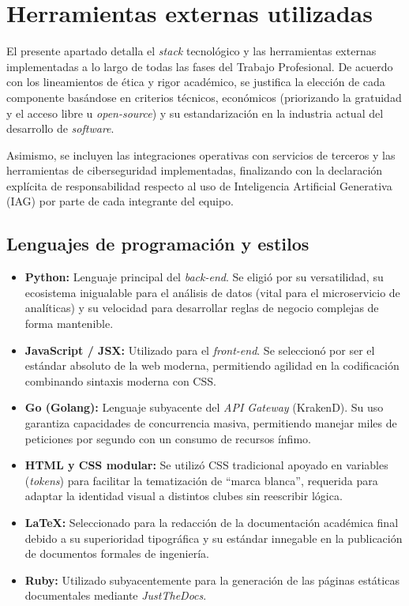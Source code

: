 \section{Herramientas externas utilizadas}

El presente apartado detalla el \textit{stack} tecnológico y las herramientas externas implementadas a lo largo de todas las fases del Trabajo Profesional. De acuerdo con los lineamientos de ética y rigor académico, se justifica la elección de cada componente basándose en criterios técnicos, económicos (priorizando la gratuidad y el acceso libre u \textit{open-source}) y su estandarización en la industria actual del desarrollo de \textit{software}.

Asimismo, se incluyen las integraciones operativas con servicios de terceros y las herramientas de ciberseguridad implementadas, finalizando con la declaración explícita de responsabilidad respecto al uso de Inteligencia Artificial Generativa (IAG) por parte de cada integrante del equipo.

\subsection{Lenguajes de programación y estilos}

\begin{itemize}
    \item \textbf{Python:} Lenguaje principal del \textit{back-end}. Se eligió por su versatilidad, su ecosistema inigualable para el análisis de datos (vital para el microservicio de analíticas) y su velocidad para desarrollar reglas de negocio complejas de forma mantenible.
    \item \textbf{JavaScript / JSX:} Utilizado para el \textit{front-end}. Se seleccionó por ser el estándar absoluto de la web moderna, permitiendo agilidad en la codificación combinando sintaxis moderna con CSS.
    \item \textbf{Go (Golang):} Lenguaje subyacente del \textit{API Gateway} (KrakenD). Su uso garantiza capacidades de concurrencia masiva, permitiendo manejar miles de peticiones por segundo con un consumo de recursos ínfimo.
    \item \textbf{HTML y CSS modular:} Se utilizó CSS tradicional apoyado en variables (\textit{tokens}) para facilitar la tematización de ``marca blanca'', requerida para adaptar la identidad visual a distintos clubes sin reescribir lógica.
    \item \textbf{LaTeX:} Seleccionado para la redacción de la documentación académica final debido a su superioridad tipográfica y su estándar innegable en la publicación de documentos formales de ingeniería.
    \item \textbf{Ruby:} Utilizado subyacentemente para la generación de las páginas estáticas documentales mediante \textit{JustTheDocs}.
\end{itemize}


